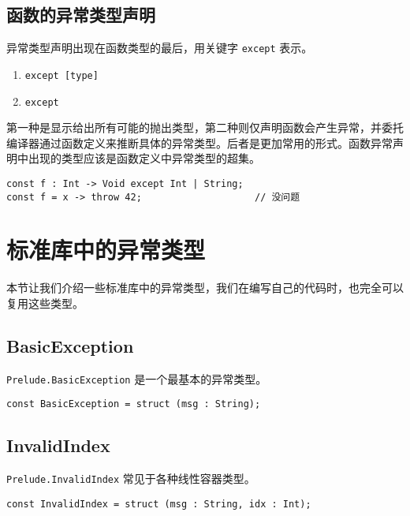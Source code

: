\subsection{函数的异常类型声明}

异常类型声明出现在函数类型的最后，用关键字 \lstinline!except! 表示。

\begin{grammar}[异常类型声明] \label{grm:exception-type-declaration}
\begin{enumerate}
	\item \lstinline!except [type]!
	\item \lstinline!except!
\end{enumerate}
\end{grammar}

第一种是显示给出所有可能的抛出类型，第二种则仅声明函数会产生异常，并委托编译器通过函数定义来推断具体的异常类型。后者是更加常用的形式。函数异常声明中出现的类型应该是函数定义中异常类型的超集。

\begin{lstlisting}
const f : Int -> Void except Int | String;
const f = x -> throw 42;					// 没问题
\end{lstlisting}


\section{标准库中的异常类型}

本节让我们介绍一些标准库中的异常类型，我们在编写自己的代码时，也完全可以复用这些类型。

\subsection{BasicException}

\lstinline!Prelude.BasicException! 是一个最基本的异常类型。

\begin{lstlisting}
const BasicException = struct (msg : String);
\end{lstlisting}


\subsection{InvalidIndex}

\lstinline!Prelude.InvalidIndex! 常见于各种线性容器类型。

\begin{lstlisting}
const InvalidIndex = struct (msg : String, idx : Int);
\end{lstlisting}
